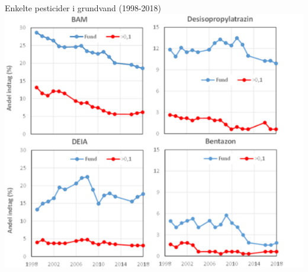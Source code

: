 \begin{frame}{Enkelte pesticider i grundvand (1998-2018)}
  \center
  \includegraphics[width=.75\textwidth]{figures/pesticides}
\end{frame}

